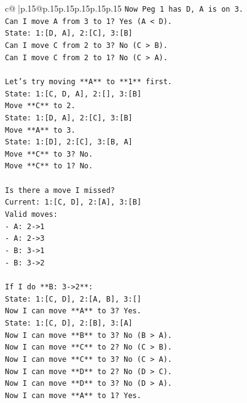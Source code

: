 \documentclass{article}
\begin{document}
{\begin{supertabular}{c@{$\;$}|p{.15\linewidth}@{}p{.15\linewidth}p{.15\linewidth}p{.15\linewidth}p{.15\linewidth}p{.15\linewidth}}
{{{\texttt{Now Peg 1 has D, A is on 3.} \\
\texttt{Can I move A from 3 to 1? Yes (A < D).} \\
\texttt{State: 1:{[}D, A{]}, 2:{[}C{]}, 3:{[}B{]}} \\
\texttt{Can I move C from 2 to 3? No (C > B).} \\
\texttt{Can I move C from 2 to 1? No (C > A).} \\
\\ 
\texttt{Let's try moving **A** to **1** first.} \\
\texttt{State: 1:{[}C, D, A{]}, 2:{[}{]}, 3:{[}B{]}} \\
\texttt{Move **C** to 2.} \\
\texttt{State: 1:{[}D, A{]}, 2:{[}C{]}, 3:{[}B{]}} \\
\texttt{Move **A** to 3.} \\
\texttt{State: 1:{[}D{]}, 2:{[}C{]}, 3:{[}B, A{]}} \\
\texttt{Move **C** to 3? No.} \\
\texttt{Move **C** to 1? No.} \\
\\ 
\texttt{Is there a move I missed?} \\
\texttt{Current: 1:{[}C, D{]}, 2:{[}A{]}, 3:{[}B{]}} \\
\texttt{Valid moves:} \\
\texttt{{-} A: 2{-}>1} \\
\texttt{{-} A: 2{-}>3} \\
\texttt{{-} B: 3{-}>1} \\
\texttt{{-} B: 3{-}>2} \\
\\ 
\texttt{If I do **B: 3{-}>2**:} \\
\texttt{State: 1:{[}C, D{]}, 2:{[}A, B{]}, 3:{[}{]}} \\
\texttt{Now I can move **A** to 3? Yes.} \\
\texttt{State: 1:{[}C, D{]}, 2:{[}B{]}, 3:{[}A{]}} \\
\texttt{Now I can move **B** to 3? No (B > A).} \\
\texttt{Now I can move **C** to 2? No (C > B).} \\
\texttt{Now I can move **C** to 3? No (C > A).} \\
\texttt{Now I can move **D** to 2? No (D > C).} \\
\texttt{Now I can move **D** to 3? No (D > A).} \\
\texttt{Now I can move **A** to 1? Yes.} \\
}}}
\end{supertabular}}
\end{document}

